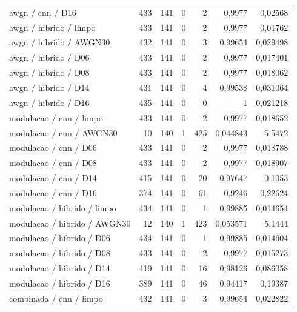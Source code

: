 \begin{longtable}{@{}p{.38\linewidth}rrrrrr@{}}
awgn /\allowbreak{} cnn /\allowbreak{} D16 & 433 & 141 & 0 & 2 & 0,9977 & 0,02568\\
awgn /\allowbreak{} hibrido /\allowbreak{} limpo & 433 & 141 & 0 & 2 & 0,9977 & 0,01762\\
awgn /\allowbreak{} hibrido /\allowbreak{} AWGN30 & 432 & 141 & 0 & 3 & 0,99654 & 0,029498\\
awgn /\allowbreak{} hibrido /\allowbreak{} D06 & 433 & 141 & 0 & 2 & 0,9977 & 0,017401\\
awgn /\allowbreak{} hibrido /\allowbreak{} D08 & 433 & 141 & 0 & 2 & 0,9977 & 0,018062\\
awgn /\allowbreak{} hibrido /\allowbreak{} D14 & 431 & 141 & 0 & 4 & 0,99538 & 0,031064\\
awgn /\allowbreak{} hibrido /\allowbreak{} D16 & 435 & 141 & 0 & 0 & 1 & 0,021218\\
modulacao /\allowbreak{} cnn /\allowbreak{} limpo & 433 & 141 & 0 & 2 & 0,9977 & 0,018652\\
modulacao /\allowbreak{} cnn /\allowbreak{} AWGN30 & 10 & 140 & 1 & 425 & 0,044843 & 5,5472\\
modulacao /\allowbreak{} cnn /\allowbreak{} D06 & 433 & 141 & 0 & 2 & 0,9977 & 0,018788\\
modulacao /\allowbreak{} cnn /\allowbreak{} D08 & 433 & 141 & 0 & 2 & 0,9977 & 0,018907\\
modulacao /\allowbreak{} cnn /\allowbreak{} D14 & 415 & 141 & 0 & 20 & 0,97647 & 0,1053\\
modulacao /\allowbreak{} cnn /\allowbreak{} D16 & 374 & 141 & 0 & 61 & 0,9246 & 0,22624\\
modulacao /\allowbreak{} hibrido /\allowbreak{} limpo & 434 & 141 & 0 & 1 & 0,99885 & 0,014654\\
modulacao /\allowbreak{} hibrido /\allowbreak{} AWGN30 & 12 & 140 & 1 & 423 & 0,053571 & 5,1444\\
modulacao /\allowbreak{} hibrido /\allowbreak{} D06 & 434 & 141 & 0 & 1 & 0,99885 & 0,014604\\
modulacao /\allowbreak{} hibrido /\allowbreak{} D08 & 433 & 141 & 0 & 2 & 0,9977 & 0,015273\\
modulacao /\allowbreak{} hibrido /\allowbreak{} D14 & 419 & 141 & 0 & 16 & 0,98126 & 0,086058\\
modulacao /\allowbreak{} hibrido /\allowbreak{} D16 & 389 & 141 & 0 & 46 & 0,94417 & 0,19387\\
combinada /\allowbreak{} cnn /\allowbreak{} limpo & 432 & 141 & 0 & 3 & 0,99654 & 0,022822\\

\end{longtable}
